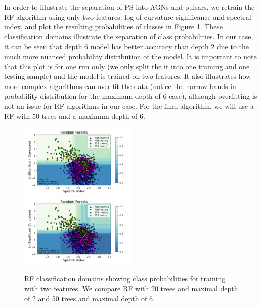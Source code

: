 In order to illustrate the separation of PS into AGNs and pulsars, we retrain the RF algorithm using only two features: log of curvature significance and spectral index, and plot the resulting probabilities of classes in Figure \ref{fig:RF_domains}. 
These classification domains illustrate the separation of class probabilities.
In our case, it can be seen that depth 6 model has better accuracy than 
depth 2 due to the much more nuanced probability distribution of the model. 
It is important to note that this plot is for one run only (we only split the it into one training and one testing sample) and the model is trained on two features.
It also illustrates how more complex algorithms can over-fit the data 
(notice the narrow bands in probability distribution for the maximum depth of 6 case), 
although overfitting is not an issue for RF algorithms in our case.
For the final algorithm, we will use a RF with 50 trees and a maximum depth of 6.

\begin{figure}[h]
\includegraphics[width=0.5\textwidth]{plots/classification_domains/rf_20_2_final.pdf}
\includegraphics[width=0.5\textwidth]{plots/classification_domains/rf_50_6_final.pdf}
\caption{RF classification domains showing class probabilities for training with two features. 
We compare RF with 20 trees and maximal depth of 2 and 50 trees and maximal depth of 6.
}  
\label{fig:RF_domains}
\end{figure}

